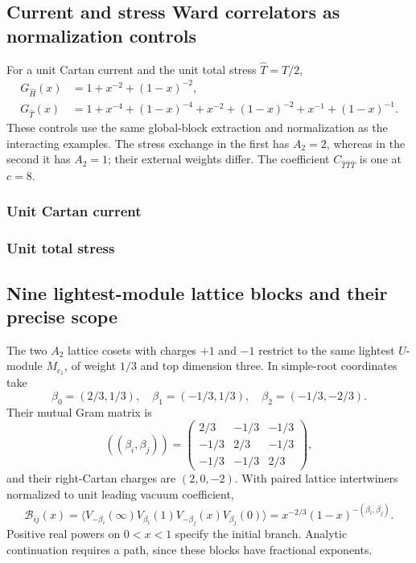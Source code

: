 \subsection{Current and stress Ward correlators as normalization controls}

For a unit Cartan current and the unit total stress $\widehat T=T/2$,
\begin{align}
 G_{\widehat H}(x)&=1+x^{-2}+(1-x)^{-2},\\
 G_{\widehat T}(x)&=1+x^{-4}+(1-x)^{-4}
 +x^{-2}+(1-x)^{-2}+x^{-1}+(1-x)^{-1}.
 \label{expphysics:ward-controls}
\end{align}
These controls use the same global-block extraction and normalization
as the interacting examples. The stress exchange in the first has
$A_2=2$, whereas in the second it has $A_2=1$; their external
weights differ. The coefficient $C_{\widehat T\widehat T\widehat T}$
is one at $c=8$.

\subsubsection{Unit Cartan current}

\subsubsection{Unit total stress}


\subsection{Nine lightest-module lattice blocks and their precise scope}

The two $A_2$ lattice cosets with charges $+1$ and $-1$ restrict
to the same lightest $U$-module $M_{c_1}$, of weight $1/3$ and
top dimension three. In simple-root coordinates take
\[
 \beta_0=(2/3,1/3),\quad
 \beta_1=(-1/3,1/3),\quad
 \beta_2=(-1/3,-2/3).
\]
Their mutual Gram matrix is
\[
 ((\beta_i,\beta_j))=
 \begin{pmatrix}2/3&-1/3&-1/3\\-1/3&2/3&-1/3\\-1/3&-1/3&2/3\end{pmatrix},
\]
and their right-Cartan charges are $(2,0,-2)$. With paired lattice
intertwiners normalized to unit leading vacuum coefficient,
\begin{equation}
 \mathcal B_{ij}(x)=
 \langle V_{-\beta_i}(\infty)V_{\beta_i}(1)
          V_{-\beta_j}(x)V_{\beta_j}(0)\rangle
 =x^{-2/3}(1-x)^{-(\beta_i,\beta_j)}.
 \label{expphysics:lightest-lattice-block}
\end{equation}
Positive real powers on $0<x<1$ specify the initial branch.
Analytic continuation requires a path, since these blocks have
fractional exponents.

